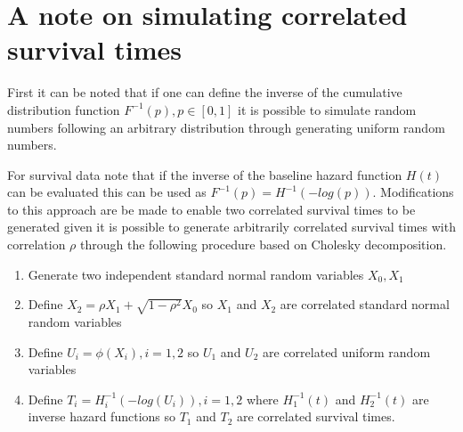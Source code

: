 
\chapter{A note on simulating correlated survival times}
\label{APP:corr}
First it can be noted that if one can define the inverse of the cumulative distribution function $F^{-1}(p), p\in [0,1]$ it is possible to simulate random numbers following an arbitrary distribution through generating uniform random numbers.

For survival data \cite{Bender2005} note that if the inverse of the baseline hazard function $H(t)$ can be evaluated this can be used as $F^{-1}(p) = H^{-1}(-log(p))$. Modifications to this approach are be made to enable two correlated survival times to be generated given it is possible to generate arbitrarily correlated survival times with correlation $\rho$ through the following procedure based on Cholesky decomposition. 
\begin{enumerate}
\item Generate two independent standard normal random variables $X_0, X_1$ 
\item Define $X_2 = \rho X_1 + \sqrt{1-\rho^2} X_0 $ so $X_1$ and $X_2$ are correlated standard normal random variables
\item Define $U_i = \phi (X_i), i=1,2$ so $U_1$ and $U_2$ are correlated uniform random variables
\item Define $T_i = H_i^{-1}(-log(U_i)), i=1,2$ where $H_1^{-1}(t)$ and $H_2^{-1}(t)$ are inverse hazard functions so $T_1$ and $T_2$ are correlated survival times.
\end{enumerate}



